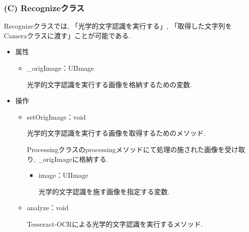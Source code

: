 \subsubsection{(C) Recognizeクラス}
Recognizeクラスでは, 「光学的文字認識を実行する」, 「取得した文字列をCameraクラスに渡す」ことが可能である.

\begin{itemize}
\item 属性

\begin{itemize}
\item \_origImage：UIImage

光学的文字認識を実行する画像を格納するための変数.
\end{itemize}

\item 操作

\begin{itemize}
\item setOrigImage：void

光学的文字認識を実行する画像を取得するためのメソッド.

Processingクラスのprocessingメソッドにて処理の施された画像を受け取り, \_origImageに格納する.
\begin{itemize}
\item image：UIImage

光学的文字認識を施す画像を指定する変数.
\end{itemize}

\item analyze：void

Tesseract-OCRによる光学的文字認識を実行するメソッド.
\end{itemize}

\end{itemize}

